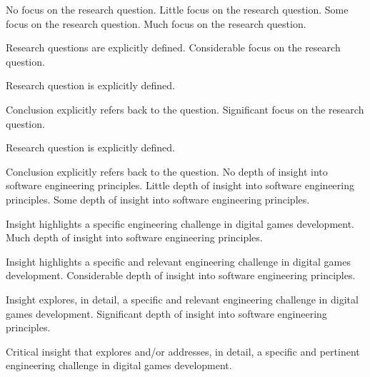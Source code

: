 \documentclass{../fal_assignment}
\begin{document}
\begin{markingrubric}
%
%
        \grade\fail 	No focus on the research question.
        \grade 		Little focus on the research question.
        \grade 		Some focus on the research question.
        \grade 		Much focus on the research question.
            \par 		Research questions are explicitly defined.
        \grade 		Considerable focus on the research question.
            \par 		Research question is explicitly defined.
            \par 		Conclusion explicitly refers back to the question.
        \grade 		Significant focus on the research question.
            \par 		Research question is explicitly defined.
            \par 		Conclusion explicitly refers back to the question.
%
        \grade\fail 	No depth of insight into software engineering principles.
        \grade 		Little depth of insight into software engineering principles.
        \grade 		Some depth of insight into software engineering principles.
        \par 		Insight highlights a specific engineering challenge in digital games development.
        \grade 		Much depth of insight into software engineering principles.
        \par 		Insight highlights a specific and relevant engineering challenge in digital games development.
        \grade 		Considerable depth of insight into software engineering principles.
        \par 		Insight explores, in detail, a specific and relevant engineering challenge in digital games development.
        \grade 		Significant depth of insight into software engineering principles.
        \par 		Critical insight that explores and/or addresses, in detail, a specific and pertinent engineering challenge in digital games development.

\end{markingrubric}
\end{document}
